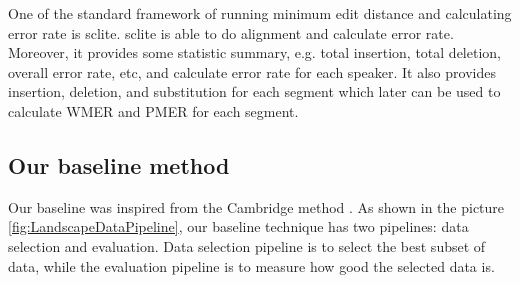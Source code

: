 One of the standard framework of running minimum edit distance and calculating error rate is sclite. sclite is able to do alignment and calculate error rate. Moreover, it provides some statistic summary, e.g. total insertion, total deletion, overall error rate, etc, and calculate error rate for each speaker. It also provides insertion, deletion, and substitution for each segment which later can be used to calculate WMER and PMER for each segment.  



\subsection{Our baseline method}


Our baseline was inspired from the Cambridge method \cite{Woodland2015}. As shown in the picture \ref{fig:LandscapeDataPipeline}, our baseline technique has two pipelines: data selection and evaluation. Data selection pipeline is to select the best subset of data, while the evaluation pipeline is to measure how good the selected data is. 

